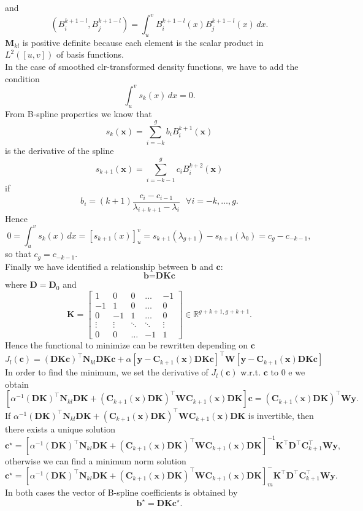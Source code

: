 and \[(B_{i}^{k+1-l}, B_{j}^{k+1-l}) = \int_u^v B_{i}^{k+1-l}(x)B_{j}^{k+1-l}(x) \, dx.\]
$\textbf{M}_{kl}$ is positive definite because each element is the scalar product in $L^2([u,v])$ of basis functions. \\
In the case of  smoothed clr-transformed density functions, we have to add the condition
\[\int_u^v s_k(x) \, dx = 0.\] 
From B-spline properties we know that 
\[  s_k(\textbf{x})=\sum\limits_{i=-k}^{g}b_iB_i^{k+1}(\textbf{x}) \]
is the derivative of the spline
\[  s_{k+1}(\textbf{x})=\sum\limits_{i=-k-1}^{g}c_iB_i^{k+2}(\textbf{x}) \]
if
\[b_i = (k+1)\frac{c_i-c_{i-1}}{\lambda_{i+k+1}-\lambda_{i}}\ \ \  \forall i = -k, \dots, g.\]
Hence 
\[ 0 = \int_u^v s_k(x) \, dx = [s_{k+1}(x)]_u^v = s_{k+1}(\lambda_{g+1})-s_{k+1}(\lambda_{0}) = c_g-c_{-k-1},\]
so that $c_g = c_{-k-1}$.\\
Finally we have identified a relationship between $\textbf{b}$ and $\textbf{c}$:
\[\textbf{b} = \textbf{D}\textbf{K}\textbf{c}\] 
where $ \textbf{D} = \textbf{D}_0$ and
\[  \textbf{K} =
\begin{bmatrix}
1 &0&0& \dots  & -1 \\
-1 &1&0& \dots  & 0 \\
0 &-1&1& \dots  & 0 \\
\vdots &\vdots & \ddots & \ddots& \vdots \\
0 &0 & \dots&-1  & 1
\end{bmatrix} \in \mathbb{R}^{g+k+1, g+k+1}. \]
Hence the functional to minimize can be rewritten depending on $\textbf{c}$
\[J_l(\textbf{c}) = (\textbf{D}\textbf{K}\textbf{c})^\top \textbf{N}_{kl}\textbf{D}\textbf{K}\textbf{c} + \alpha [\textbf{y}-\textbf{C}_{k+1}(\textbf{x})\textbf{D}\textbf{K}\textbf{c}]^\top \textbf{W} [\textbf{y}-\textbf{C}_{k+1}(\textbf{x})\textbf{D}\textbf{K}\textbf{c}]\]
In order to find the minimum, we set the derivative of $J_l(\textbf{c})$ w.r.t. $\textbf{c}$ to 0 e we obtain
\[ [\alpha^{-1}(\textbf{D}\textbf{K})^\top \textbf{N}_{kl} \textbf{D}\textbf{K}+ (\textbf{C}_{k+1}(\textbf{x})\textbf{D}\textbf{K})^\top\textbf{W}\textbf{C}_{k+1}(\textbf{x})\textbf{D}\textbf{K}]\textbf{c} = (\textbf{C}_{k+1}(\textbf{x})\textbf{D}\textbf{K})^\top \textbf{W}\textbf{y}.\]
If $\alpha^{-1}(\textbf{D}\textbf{K})^\top \textbf{N}_{kl} \textbf{D}\textbf{K}+ (\textbf{C}_{k+1}(\textbf{x})\textbf{D}\textbf{K})^\top\textbf{W}\textbf{C}_{k+1}(\textbf{x})\textbf{D}\textbf{K}$ is invertible, then there exists a unique solution 
\[\textbf{c}^\star = [\alpha^{-1}(\textbf{D}\textbf{K})^\top \textbf{N}_{kl} \textbf{D}\textbf{K}+ (\textbf{C}_{k+1}(\textbf{x})\textbf{D}\textbf{K})^\top\textbf{W}\textbf{C}_{k+1}(\textbf{x})\textbf{D}\textbf{K}]^{-1}\textbf{K}^\top\textbf{D}^\top\textbf{C}_{k+1}^\top \textbf{W}\textbf{y},\]
otherwise we can find a minimum norm solution
\[\textbf{c}^\star = [\alpha^{-1}(\textbf{D}\textbf{K})^\top \textbf{N}_{kl} \textbf{D}\textbf{K}+ (\textbf{C}_{k+1}(\textbf{x})\textbf{D}\textbf{K})^\top\textbf{W}\textbf{C}_{k+1}(\textbf{x})\textbf{D}\textbf{K}]_{m}^{-}\textbf{K}^\top\textbf{D}^\top\textbf{C}_{k+1}^\top \textbf{W}\textbf{y}.\]
In both cases the vector of B-spline coefficients is obtained by
\[\textbf{b}^\star = \textbf{D}\textbf{K}\textbf{c}^\star.\] 


